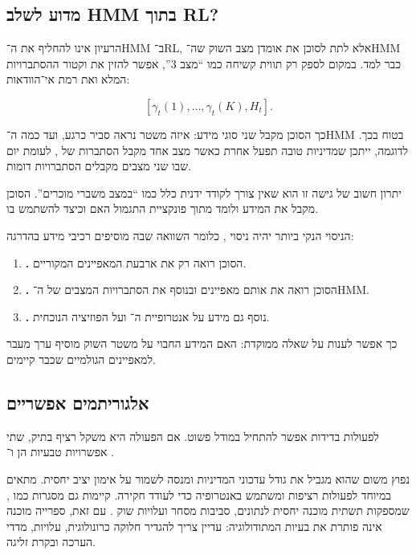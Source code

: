 \subsection{מדוע לשלב HMM בתוך RL?}

הרעיון אינו להחליף את ה־HMM ב־RL, אלא לתת לסוכן את אומדן מצב השוק שה־HMM כבר למד. במקום לספק רק תווית קשיחה כמו ``מצב 3'', אפשר להזין את וקטור ההסתברויות המלא ואת רמת אי־הוודאות:

\begin{equation}
\left[\gamma_t(1),\ldots,\gamma_t(K),H_t\right].
\end{equation}

כך הסוכן מקבל שני סוגי מידע: איזה משטר נראה סביר כרגע, ועד כמה ה־HMM בטוח בכך. לדוגמה, ייתכן שמדיניות טובה תפעל אחרת כאשר מצב אחד מקבל הסתברות של , לעומת יום שבו שני מצבים מקבלים הסתברויות דומות.

יתרון חשוב של גישה זו הוא שאין צורך לקודד ידנית כלל כמו ``במצב משברי מוכרים''. הסוכן מקבל את המידע ולומד מתוך פונקציית התגמול האם וכיצד להשתמש בו.

הניסוי הנקי ביותר יהיה ניסוי , כלומר השוואה שבה מוסיפים רכיבי מידע בהדרגה:

\begin{enumerate}
    \item \textbf{.} הסוכן רואה רק את ארבעת המאפיינים המקוריים.
    \item \textbf{.} הסוכן רואה את אותם מאפיינים ובנוסף את הסתברויות המצבים של ה־HMM.
    \item \textbf{.} נוסף גם מידע על אנטרופיית ה־ ועל הפוזיציה הנוכחית.
\end{enumerate}

כך אפשר לענות על שאלה ממוקדת: האם המידע החבוי על משטר השוק מוסיף ערך מעבר למאפיינים הגולמיים שכבר קיימים.

\subsection{אלגוריתמים אפשריים}

לפעולות בדידות אפשר להתחיל במודל  פשוט. אם הפעולה היא משקל רציף בתיק, שתי אפשרויות טבעיות הן  \cite{schulman2017ppo} ו־ \cite{haarnoja2018sac}.

 נפוץ משום שהוא מגביל את גודל עדכוני המדיניות ומנסה לשמור על אימון יציב יחסית.  מתאים במיוחד לפעולות רציפות ומשתמש באנטרופיה כדי לעודד חקירה. קיימות גם מסגרות כמו , שמספקות תשתית מוכנה יחסית לנתונים, סביבות מסחר ועלויות שוק \cite{liu2021finrl}. עם זאת, ספרייה מוכנה אינה פותרת את בעיות המתודולוגיה: עדיין צריך להגדיר חלוקה כרונולוגית, עלויות, מדדי הערכה ובקרת זליגה.


